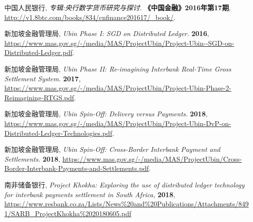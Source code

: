 \begin{thebibliography}{99}
     中国人民银行,
    \newblock \textit{专辑:央行数字货币研究与探讨. }
    \newblock \textbf{《中国金融》2016年第17期},
    \newblock \url{http://v1.8btc.com/books/834/cnfinance201617/_book/}.
    
     新加坡金融管理局,
    \newblock \textit{Ubin Phase I: SGD on Distributed Ledger.}
    \newblock \textbf{2016},
    \newblock \url{https://www.mas.gov.sg/-/media/MAS/ProjectUbin/Project-Ubin--SGD-on-Distributed-Ledger.pdf}.

     新加坡金融管理局,
    \newblock \textit{Ubin Phase II: Re-imagining Interbank Real-Time Gross Settlement System.}
    \newblock \textbf{2017},
    \newblock \url{https://www.mas.gov.sg/-/media/MAS/ProjectUbin/Project-Ubin-Phase-2-Reimagining-RTGS.pdf}.

     新加坡金融管理局,
    \newblock \textit{Ubin Spin-Off: Delivery versus Payments.}
    \newblock \textbf{2018},
    \newblock \url{https://www.mas.gov.sg/-/media/MAS/ProjectUbin/Project-Ubin-DvP-on-Distributed-Ledger-Technologies.pdf}.

     新加坡金融管理局,
    \newblock \textit{Ubin Spin-Off: Cross-Border Interbank Payment and Settlements.}
    \newblock \textbf{2018},
    \newblock \url{https://www.mas.gov.sg/-/media/MAS/ProjectUbin/Cross-Border-Interbank-Payments-and-Settlements.pdf}.

     南非储备银行,
    \newblock \textit{Project Khokha: Exploring the use of distributed ledger technology for interbank payments settlement in South Africa, }
    \newblock \textbf{2018},
    \newblock \url{https://www.resbank.co.za/Lists/News\%20and\%20Publications/Attachments/8491/SARB\_ProjectKhokha\%2020180605.pdf}

\end{thebibliography}
